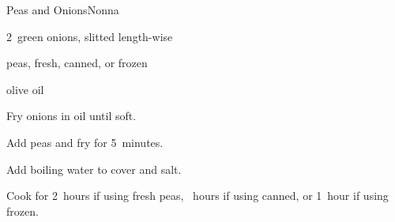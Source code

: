 \begin{recipe}{Peas and Onions}{Nonna}{}

\begin{ingredients}
\item 2~green onions, slitted length-wise
\item peas, fresh, canned, or frozen
\item olive oil
\end{ingredients}

\begin{directions}
\item Fry onions in oil until soft.
\item Add peas and fry for 5~minutes.
\item Add boiling water to cover and salt.
\item Cook for 2~hours if using fresh peas, \threequarter~hours if using canned, or 1~hour if using frozen.
\end{directions}

\end{recipe}
